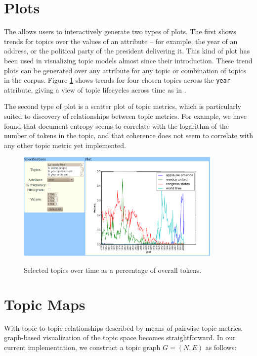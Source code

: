 \documentclass[11pt]{article}
\begin{document}
\section{Plots}
The \tool{} allows users to interactively generate two types of plots. The ﬁrst
shows trends for topics over the values of an attribute -- for example, the year
of an address, or the political party of the president delivering it. This kind
of plot has been used in visualizing topic models almost since their
introduction. These trend plots can be generated over any attribute for any
topic or combination of topics in the corpus. Figure \ref{fig:chart} shows
trends for four chosen topics across the \texttt{year} attribute, giving a view
of topic lifecycles across time as in \cite{Griffiths2004,Wang2006}.

The second type of plot is a scatter plot of topic metrics, which is
particularly suited to discovery of relationships between topic metrics. For
example, we have found that document entropy seems to correlate with the
logarithm of the number of tokens in the topic, and that coherence does not seem
to correlate with any other topic metric yet implemented.


\begin{figure}[t]
 \centering
 \includegraphics[height=200px,keepaspectratio=true]{./topics_vs_years.png}
 \label{fig:chart}
 \caption{Selected topics over time as a percentage of overall tokens.}
\end{figure}

\section{Topic Maps}\label{sec:maps}
With topic-to-topic relationships described by means of pairwise topic metrics,
graph-based visualization of the topic space becomes straightforward. In our
current implementation, we construct a topic graph $G = (N, E)$ as follows:
\end{document}
